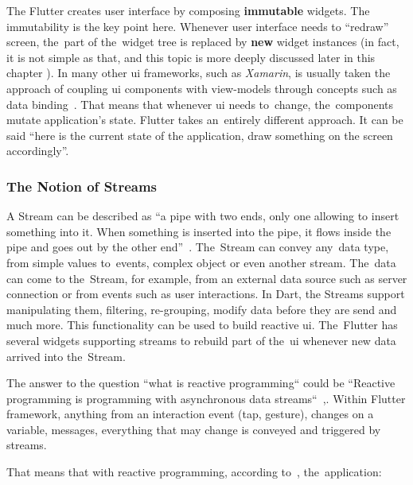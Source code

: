 The Flutter creates user interface by composing \textbf{immutable} widgets. The immutability is the key point here. Whenever user interface needs to ``redraw'' screen, the~part of the~widget tree is replaced by \textbf{new} widget instances (in fact, it is not simple as that, and this topic is more deeply discussed later in this chapter ). In many other \gls{ui} frameworks, such as \textit{Xamarin}, is usually taken the approach of coupling \gls{ui} components with view-models through concepts such as data binding~\cite{xamarin-data-binding}. That means that whenever \gls{ui} needs to~change, the~components mutate application's state. Flutter takes an~entirely different approach. It can be said ``here is the current state of the application, draw something on the screen accordingly''.

\subsubsection{The Notion of Streams}
A Stream can be described as ``a pipe with two ends, only one allowing to insert something into it. When something is inserted into the pipe, it flows inside the pipe and goes out by the other end''~\cite{reactive-didier}. The~Stream can convey any~data type, from simple values to~events, complex object or even another stream. The~data can come to the~Stream, for example, from an external data source such as server connection or from events such as user interactions. In Dart, the Streams support manipulating them, filtering, re-grouping, modify data before they are send and much more. This functionality can be used to build reactive \gls{ui}. The~Flutter has several widgets supporting streams to rebuild part of the~\gls{ui} whenever new data arrived into the~Stream.

The answer to the question ``what is reactive programming`` could be ``Reactive programming is programming with asynchronous data streams``~\cite{reactive-didier},\cite{reactive-red-hat}. Within Flutter framework, anything from an interaction event (tap, gesture), changes on a variable, messages, everything that may change is conveyed and triggered by streams.

That means that with reactive programming, according to~\cite{reactive-didier}, the~application:

